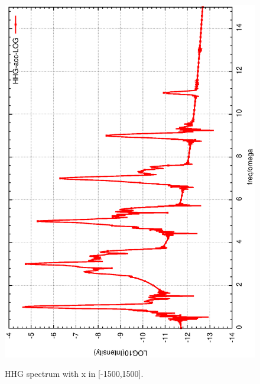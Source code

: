 \documentclass{isildur}
\begin{document}
\begin{itemize}
\begin{figure}[htbp]
{{{\includegraphics[width=\linewidth]{fig2b.eps}} }}
\caption{HHG spectrum with x in [-1500,1500].
 }
\end{figure}
\begin{figure}[htbp]
\centering
\mbox{}
\end{figure}
\end{itemize}
\end{document}
